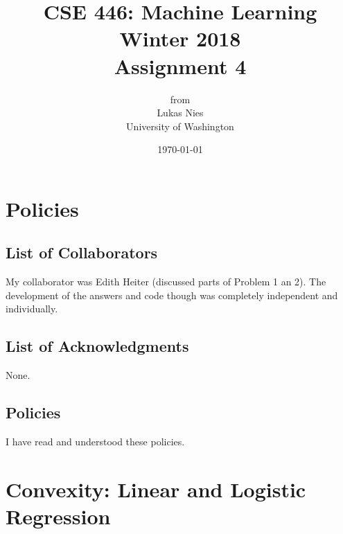 \documentclass[12pt]{article}
\begin{document}
	
	\title{
		\textbf{\huge{CSE 446: Machine Learning Winter 2018 }} \\[2cm]
		\LARGE{Assignment 4}\\[1cm]
	}
	\author{from \\ Lukas Nies \\ University of Washington}
	\date{\today}
	\clearpage\maketitle\thispagestyle{empty}
	\newpage

	\tableofcontents
	\setcounter{page}{0}
	\newpage
	
	\setcounter{section}{-1}
	

\section{Policies}

\subsection{List of Collaborators}

My collaborator was Edith Heiter (discussed parts of Problem 1 an 2). The development of the answers and code though was completely independent and individually.

\subsection{List of Acknowledgments}

None.

\subsection{Policies}

I have read and understood these policies.


\newpage

\section{Convexity: Linear and Logistic Regression}
\end{document}
